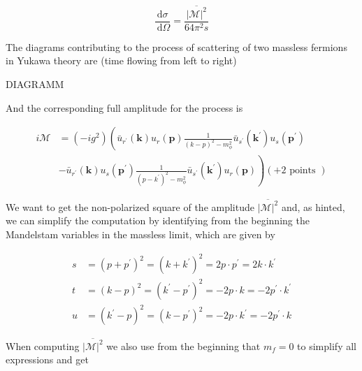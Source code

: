 \documentclass[10pt, letterpaper]{article}
\begin{document}
$$
\frac{\mathrm{d} \sigma}{\mathrm{~d} \Omega}=\frac{\overline{|\mathcal{M}|^2}}{64 \pi^2 s}
$$



The diagrams contributing to the process of scattering of two massless fermions in Yukawa theory are (time flowing from left to right)


DIAGRAMM

And the corresponding full amplitude for the process is

$$
\begin{aligned}
i \mathcal{M} & =\left(-i g^2\right)\left(\bar{u}_{r^{\prime}}(\mathbf{k}) u_r(\mathbf{p}) \frac{1}{(k-p)^2-m_\phi^2} \bar{u}_{s^{\prime}}\left(\mathbf{k}^{\prime}\right) u_s\left(\mathbf{p}^{\prime}\right)\right. \\
& \left.-\bar{u}_{r^{\prime}}(\mathbf{k}) u_s\left(\mathbf{p}^{\prime}\right) \frac{1}{\left(p-k^{\prime}\right)^2-m_\phi^2} \bar{u}_{s^{\prime}}\left(\mathbf{k}^{\prime}\right) u_r(\mathbf{p})\right)(+2 \text { points })
\end{aligned}
$$


We want to get the non-polarized square of the amplitude $\overline{|\mathcal{M}|^2}$ and, as hinted, we can simplify the computation by identifying from the beginning the Mandelstam variables in the massless limit, which are given by

$$
\begin{aligned}
s & =\left(p+p^{\prime}\right)^2=\left(k+k^{\prime}\right)^2=2 p \cdot p^{\prime}=2 k \cdot k^{\prime} \\
t & =(k-p)^2=\left(k^{\prime}-p^{\prime}\right)^2=-2 p \cdot k=-2 p^{\prime} \cdot k^{\prime} \\
u & =\left(k^{\prime}-p\right)^2=\left(k-p^{\prime}\right)^2=-2 p \cdot k^{\prime}=-2 p^{\prime} \cdot k
\end{aligned}
$$


When computing $\overline{|\mathcal{M}|^2}$ we also use from the beginning that $m_f=0$ to simplify all expressions and get
\end{document}
